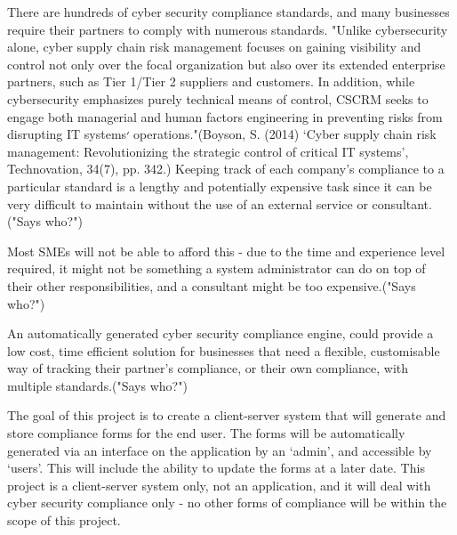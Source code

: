 There are hundreds of cyber security compliance standards, and many businesses require their partners to comply with numerous standards. "Unlike cybersecurity alone, cyber supply chain risk management focuses on gaining visibility and control not only over the focal organization but also over its extended enterprise partners, such as Tier 1/Tier 2 suppliers and customers. In addition, while cybersecurity emphasizes purely technical means of control, CSCRM seeks to engage both managerial and human factors engineering in preventing risks from disrupting IT systems׳ operations."(Boyson, S. (2014) ‘Cyber supply chain risk management: Revolutionizing the strategic control of critical IT systems’, Technovation, 34(7), pp. 342.) Keeping track of each company’s compliance to a particular standard is a lengthy and potentially expensive task since it can be very difficult to maintain without the use of an external service or consultant. ("Says who?")

Most SMEs will not be able to afford this - due to the time and experience level required, it might not be something a system administrator can do on top of their other responsibilities, and a consultant might be too expensive.("Says who?")

An automatically generated cyber security compliance engine, could provide a low cost, time efficient solution for businesses that need a flexible, customisable way of tracking their partner’s compliance, or their own compliance, with multiple standards.("Says who?")

The goal of this project is to create a client-server system that will generate and store compliance forms for the end user. The forms will be automatically generated via an interface on the application by an ‘admin’, and accessible by ‘users’. This will include the ability to update the forms at a later date. This project is a client-server system only, not an application, and it will deal with cyber security compliance only - no other forms of compliance will be within the scope of this project.
